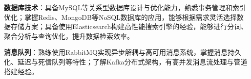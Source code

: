 \item \textbf{数据库技术}：具备MySQL等关系型数据库设计与优化能力，熟悉事务管理和索引优化；掌握Redis、MongoDB等NoSQL数据库的应用，能够根据需求灵活选择数据存储方案；具备使用Elasticsearch构建高性能搜索引擎的经验，能够进行分词、聚合分析与查询优化，提升数据检索效率。
\item \textbf{消息队列}：熟练使用RabbitMQ实现异步解耦与高可用消息系统，掌握消息持久化、延迟与死信队列等特性；了解Kafka分布式架构，有高并发消息流处理与管道搭建经验。